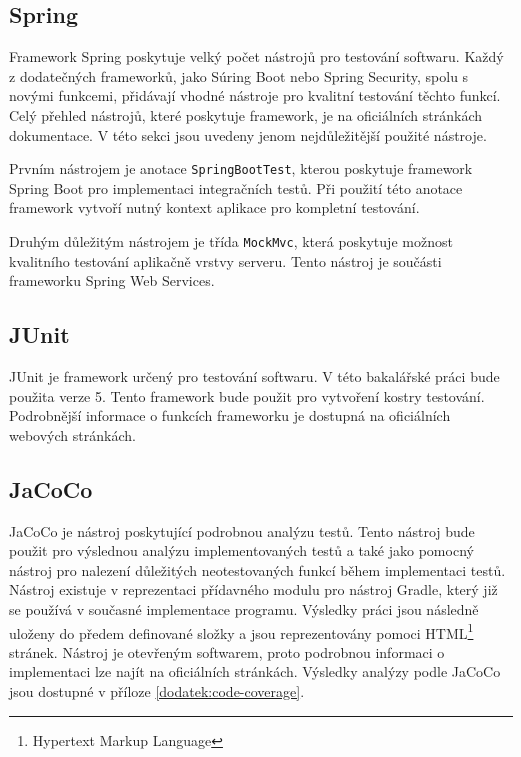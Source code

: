     \subsection{Spring}
        Framework Spring poskytuje velký počet nástrojů pro testování softwaru. Každý z dodatečných frameworků, jako Súring Boot nebo Spring Security, spolu s novými funkcemi, přidávají vhodné nástroje pro kvalitní testování těchto funkcí. Celý přehled nástrojů, které poskytuje framework, je na oficiálních stránkách dokumentace\cite{spring-tests-doc}. V této sekci jsou uvedeny jenom nejdůležitější použité nástroje.
        
        Prvním nástrojem je anotace \texttt{SpringBootTest}, kterou poskytuje framework Spring Boot pro implementaci integračních testů. Při použití této anotace framework vytvoří nutný kontext aplikace pro kompletní testování.
        
        Druhým důležitým nástrojem je třída \texttt{MockMvc}, která poskytuje možnost kvalitního testování aplikačně vrstvy serveru. Tento nástroj je součásti frameworku Spring Web Services.
        
    \subsection{JUnit}
        JUnit je framework určený pro testování softwaru. V této bakalářské práci bude použita verze 5. Tento framework bude použit pro vytvoření kostry testování. Podrobnější informace o funkcích frameworku je dostupná na oficiálních webových stránkách\cite{junit-doc}.
        
    \subsection{JaCoCo}\label{resere:testovani:jacoco}
        JaCoCo je nástroj poskytující podrobnou analýzu testů. Tento nástroj bude použit pro výslednou analýzu implementovaných testů a také jako pomocný nástroj pro nalezení důležitých neotestovaných funkcí během implementaci testů. Nástroj existuje v reprezentaci přídavného modulu pro nástroj Gradle, který již se používá v současné implementace programu. Výsledky práci jsou následně uloženy do předem definované složky a jsou reprezentovány pomoci HTML\footnote{Hypertext Markup Language} stránek. Nástroj je otevřeným softwarem, proto podrobnou informaci o implementaci lze najít na oficiálních stránkách\cite{jacoco-implementation}. Výsledky analýzy podle JaCoCo jsou dostupné v příloze \ref{dodatek:code-coverage}.
        
